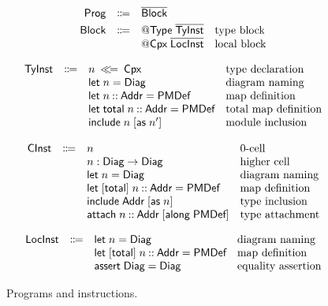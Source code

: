\documentclass[acmsmall,screen,nonacm]{acmart}
\begin{document}
\begin{figure}[t]
\[
  \begin{array}{rcll}
    \textsf{Prog}  & \Coloneqq & \overline{\textsf{Block}}         \\[3pt]
    \textsf{Block} & \Coloneqq & \mathsf{@Type}\;\overline{\textsf{TyInst}}
             & \text{type block} \\
           &           & \mathsf{@}\textsf{Cpx}\;\overline{\textsf{LocInst}}
             & \text{local block}
  \end{array}
\]

\[
  \begin{array}{rcll}
    \textsf{TyInst} & \Coloneqq & n \;\mathbin{\ll\!=}\; \textsf{Cpx}
              & \text{type declaration} \\
            &           & \mathsf{let}\;n = \textsf{Diag}
              & \text{diagram naming} \\
            &           & \mathsf{let}\;n \mathbin{::} \textsf{Addr} = \textsf{PMDef}
              & \text{map definition} \\
            &           & \mathsf{let}\;\mathsf{total}\;n \mathbin{::} \textsf{Addr} = \textsf{PMDef}
              & \text{total map definition} \\
            &           & \mathsf{include}\;n\;[\mathsf{as}\;n']
              & \text{module inclusion}
  \end{array}
\]

\[
  \begin{array}{rcll}
    \textsf{CInst} & \Coloneqq & n                   & \text{0-cell} \\
           &           & n : \textsf{Diag} \to \textsf{Diag} & \text{higher cell} \\
           &           & \mathsf{let}\;n = \textsf{Diag} & \text{diagram naming} \\
           &           & \mathsf{let}\;[\mathsf{total}]\;n \mathbin{::} \textsf{Addr} = \textsf{PMDef}
             & \text{map definition} \\
           &           & \mathsf{include}\;\textsf{Addr}\;[\mathsf{as}\;n]
             & \text{type inclusion} \\
           &           & \mathsf{attach}\;n \mathbin{::} \textsf{Addr}\;[\mathsf{along}\;\textsf{PMDef}]
             & \text{type attachment}
  \end{array}
\]

\[
  \begin{array}{rcll}
    \textsf{LocInst} & \Coloneqq & \mathsf{let}\;n = \textsf{Diag}
               & \text{diagram naming} \\
             &           & \mathsf{let}\;[\mathsf{total}]\;n \mathbin{::} \textsf{Addr} = \textsf{PMDef}
               & \text{map definition} \\
             &           & \mathsf{assert}\;\textsf{Diag} = \textsf{Diag}
               & \text{equality assertion}
  \end{array}
\]
\caption{Programs and instructions.}
\label{fig:syntax:prog}
\end{figure}
\end{document}
